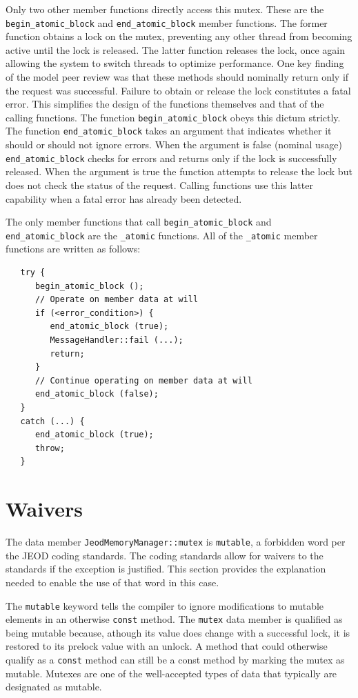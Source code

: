 Only two other member functions directly access this mutex. These are the
\verb|begin_atomic_block| and \verb|end_atomic_block| member functions.
The former function obtains a lock on the mutex, preventing any other thread
from becoming active until the lock is released.
The latter function releases the lock, once again allowing the system to switch
threads to optimize performance. One key finding of the model peer review
was that these methods should nominally return only if the request was
successful. Failure to obtain or release the lock constitutes a fatal error.
This simplifies the design of the functions themselves and that of the
calling functions.
The function \verb|begin_atomic_block| obeys this dictum strictly.
The function \verb|end_atomic_block| takes an argument that indicates
whether it should or should not ignore errors. When the argument is false
(nominal usage) \verb|end_atomic_block| checks for errors and returns only
if the lock is successfully released. When the argument is true the function
attempts to release the lock but does not check the status of the request.
Calling functions use this latter capability when a fatal error has already
been detected.

The only member functions that call
\verb|begin_atomic_block| and \verb|end_atomic_block| are the
\verb|_atomic| functions. All of the \verb|_atomic| member functions are
written as follows:
\begin{verbatim}
   try {
      begin_atomic_block ();
      // Operate on member data at will
      if (<error_condition>) {
         end_atomic_block (true);
         MessageHandler::fail (...);
         return;
      }
      // Continue operating on member data at will
      end_atomic_block (false);
   }
   catch (...) {
      end_atomic_block (true);
      throw;
   }
\end{verbatim}


\section{Waivers}
The data member \verb|JeodMemoryManager::mutex| is \verb|mutable|, a forbidden
word per the JEOD coding standards. The coding standards allow for waivers to
the standards if the exception is justified. This section provides the
explanation needed to enable the use of that word in this case.

The \verb|mutable| keyword tells the compiler to ignore modifications to
mutable elements in an otherwise \verb|const| method.
The \verb|mutex| data member is qualified as being mutable because,
athough its value does change with a successful lock, it is restored
to its prelock value with an unlock. A method that could otherwise qualify
as a \verb|const| method can still be a const method by marking the mutex
as mutable. Mutexes are one of the well-accepted types of data that typically
are designated as mutable.

